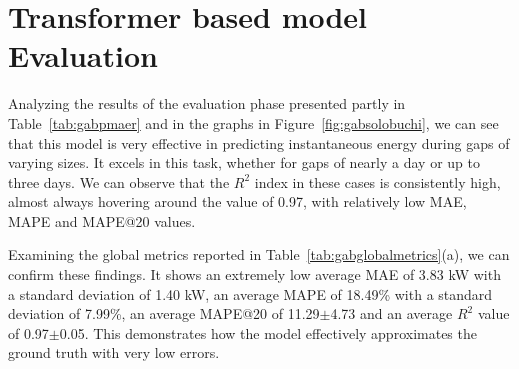 \section{Transformer based model Evaluation}
Analyzing the results of the evaluation phase presented partly in Table~\ref{tab:gabpmaer} and in the graphs in Figure~\ref{fig:gabsolobuchi}, we can see that this model is very effective in predicting instantaneous energy during gaps of varying sizes. It excels in this task, whether for gaps of nearly a day or up to three days. We can observe that the $R^2$ index in these cases is consistently high, almost always hovering around the value of 0.97, with relatively low MAE, MAPE and MAPE@20 values.

Examining the global metrics reported in Table~\ref{tab:gabglobalmetrics}(a), we can confirm these findings. It shows an extremely low average MAE of 3.83 kW with a standard deviation of 1.40 kW, an average MAPE of 18.49\% with a standard deviation of 7.99\%, an average MAPE@20 of 11.29$\pm$4.73 and an average $R^2$ value of 0.97$\pm$0.05. This demonstrates how the model effectively approximates the ground truth with very low errors.
%


